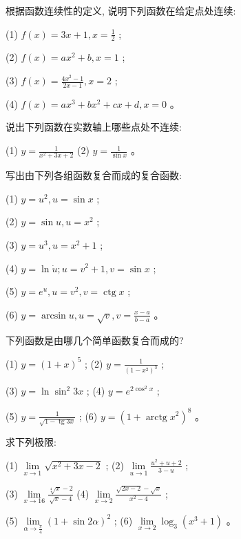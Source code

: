 \documentclass[lang=cn,newtx,12pt,scheme=chinese]{elegantbook}
\begin{document}
\begin{problemset}[习 题 三]


\item 根据函数连续性的定义, 说明下列函数在给定点处连续:

(1) \(f\left( x\right) = {3x} + 1,x = \frac{1}{2}\) ;

(2) \(f\left( x\right) = a{x}^{2} + b,x = 1\) ;

(3) \(f\left( x\right) = \frac{4{x}^{2} - 1}{{2x} - 1},x = 2\) ;

(4) \(f\left( x\right) = a{x}^{3} + b{x}^{2} + {cx} + d,x = 0\) 。

\item 说出下列函数在实数轴上哪些点处不连续:

(1) \(y = \frac{1}{{x}^{2} + {3x} + 2}\) (2) \(y = \frac{1}{\sin x}\) 。

\item 写出由下列各组函数复合而成的复合函数:

(1) \(y = {u}^{2},u = \sin x\) ;

(2) \(y = \sin u,u = {x}^{2}\) ;

(3) \(y = {u}^{3},u = {x}^{2} + 1\) ;

(4) \(y = \ln \dot{u};u = {v}^{2} + 1,v = \sin x\) ;

(5) \(y = {e}^{u},u = {v}^{2},v = \operatorname{ctg}x\) ;

(6) \(y = \arcsin u,u = \sqrt{v},v = \frac{x - a}{b - a}\) 。

\item 下列函数是由哪几个简单函数复合而成的?

(1) \(y = {\left( 1 + x\right) }^{5}\) ; (2) \(y = \frac{1}{{\left( 1 - {x}^{2}\right) }^{3}}\) ;

(3) \(y = \ln {\sin }^{2}{3x}\) ; (4) \(y = {e}^{2{\cos }^{2}x}\) ;

(5) \(y = \frac{1}{\sqrt{1 - \operatorname{tg}{3x}}}\) ; (6) \(y = {\left( 1 + \operatorname{arctg}{x}^{2}\right) }^{8}\) 。

\item 求下列极限:

(1) \(\mathop{\lim }\limits_{{x \rightarrow 1}}\sqrt{{x}^{2} + {3x} - 2}\) ; (2) \(\mathop{\lim }\limits_{{u \rightarrow 1}}\frac{{u}^{2} + u + 2}{3 - u}\) ;

(3) \(\mathop{\lim }\limits_{{x \rightarrow {16}}}\frac{\sqrt[4]{x} - 2}{\sqrt{x} - 4}\) (4) \(\mathop{\lim }\limits_{{x \rightarrow 2}}\frac{\sqrt{{2x} - 2} - \sqrt{x}}{{x}^{2} - 4}\) ;

(5) \(\mathop{\lim }\limits_{{\alpha \rightarrow \frac{\pi }{4}}}{\left( 1 + \sin 2\alpha \right) }^{2}\) ; (6) \(\mathop{\lim }\limits_{{x \rightarrow 2}}{\log }_{3}\left( {{x}^{3} + 1}\right)\) 。


\end{problemset}
\end{document}
